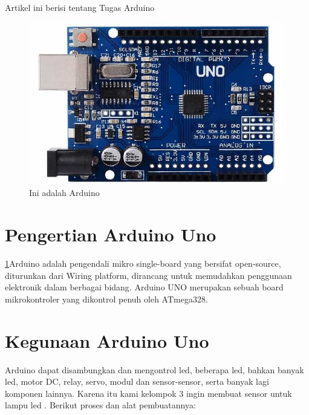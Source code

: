 \documentclass{article}
\begin{document}
Artikel ini berisi tentang Tugas Arduino
	
  \begin{figure}[ht]
  \centerline{\includegraphics[width=1\textwidth]{../figures/arduino.jpg}}
  \caption{Ini adalah Arduino}
  \label{arduino}
  \end{figure}

\section{Pengertian Arduino Uno}
\ref{arduino}Arduino adalah pengendali mikro single-board yang bersifat open-source, diturunkan dari Wiring platform, dirancang untuk memudahkan penggunaan elektronik dalam berbagai bidang. Arduino UNO merupakan sebuah board mikrokontroler yang dikontrol penuh oleh ATmega328.

\section{Kegunaan Arduino Uno}
Arduino dapat disambungkan dan mengontrol led, beberapa led, bahkan banyak led, motor DC, relay, servo, modul dan sensor-sensor, serta banyak lagi komponen lainnya.
Karena itu kami kelompok 3 ingin membuat sensor untuk lampu led . Berikut proses dan alat pembuatannya:
\end{document}
